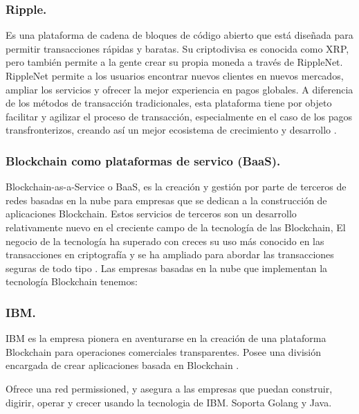 \subsubsection*{Ripple.}

Es una plataforma de cadena de bloques de código abierto que está diseñada para permitir transacciones rápidas y 
baratas. Su criptodivisa es conocida como XRP, pero también permite a la gente crear su propia moneda a través de 
RippleNet. RippleNet permite a los usuarios encontrar nuevos clientes en nuevos mercados, ampliar los servicios y 
ofrecer la mejor experiencia en pagos globales. A diferencia de los métodos de transacción tradicionales, esta 
plataforma tiene por objeto facilitar y agilizar el proceso de transacción, especialmente en el caso de los pagos 
transfronterizos, creando así un mejor ecosistema de crecimiento y desarrollo \cite{top-blockchain-platforms-app}.

\subsubsection{Blockchain como plataformas de servico (BaaS).}

Blockchain-as-a-Service o BaaS, es la creación y gestión por parte de terceros de redes basadas en la nube para 
empresas que se dedican a la construcción de aplicaciones Blockchain. Estos servicios de terceros son un desarrollo 
relativamente nuevo en el creciente campo de la tecnología de las Blockchain, El negocio de la tecnología ha superado 
con creces su uso más conocido en las transacciones en criptografía y se ha ampliado para abordar las transacciones 
seguras de todo tipo \cite{blockchain-as-a-service, top-blockchain-platforms}. Las empresas basadas en la nube que 
implementan la tecnología Blockchain tenemos:

\subsubsection*{IBM.}

IBM es la empresa pionera en aventurarse en la creación de una plataforma Blockchain para operaciones comerciales
transparentes. Posee una división encargada de crear aplicaciones basada en Blockchain \cite{top-blockchain-platforms}.

\vspace{5mm}

\noindent Ofrece una red permissioned, y asegura a las empresas que puedan construir, digirir, operar y crecer usando
la tecnologia de IBM. Soporta Golang y Java.

